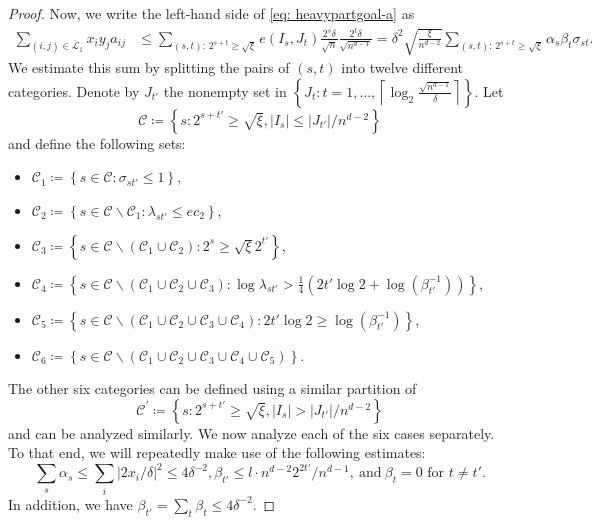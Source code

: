 \documentclass{article}
\theoremstyle{plain}
\theoremstyle{definition}
\theoremstyle{remark}
\begin{document}
\begin{appendix}
\begin{center}
\begin{proof}
			Now, we write the left-hand side of \eqref{eq: heavypartgoal-a} as
			\begin{align}
				\sum_{(i, j) \in \overline{\mathcal{L}}_1} x_i y_j a_{i j} & \leq \sum_{(s, t):\, 2^{s+t} \geq \sqrt{\xi}} e\left(I_s, J_t\right) \frac{2^s \delta}{\sqrt{n}} \frac{2^t \delta}{\sqrt{n^{d-1}}} = \delta^2 \sqrt{\frac{\xi}{n^{d-2}}} \sum_{(s, t): \,2^{s+t} \geq \sqrt{\xi}} \alpha_s \beta_t \sigma_{s t}. \label{eq: heavysum}
			\end{align}
			We estimate this sum by splitting the pairs of $(s, t)$ into twelve different categories. Denote by $J_{t'}$ the nonempty set in $\left\{J_t:t=1,\dots,\left\lceil\log _2 \frac{\sqrt{n^{d-1}}}{\delta}\right\rceil\right\}$. Let
			\[
			\mathcal{C}\coloneqq \left\{s: 2^{s+t'} \geq \sqrt{\xi},\left|I_s\right| \leq\left|J_{t'}\right|/n^{d-2}\right\}
			\] and define the following sets:
			\begin{itemize}
				\item $\mathcal{C}_1 \coloneqq \left\{s \in \mathcal{C}: \sigma_{s t'} \leq 1 \right\}$,
				\item $\mathcal{C}_2\coloneqq \left\{ s \in \mathcal{C} \backslash \mathcal{C}_1: \lambda_{s t'} \leq e c_2\right\}$,
				\item $\mathcal{C}_3\coloneqq \left\{s\in \mathcal{C} \backslash\left(\mathcal{C}_1 \cup \mathcal{C}_2\right): 2^s \geq \sqrt{\xi} 2^{t'}\right\}$,
				\item $\mathcal{C}_4\coloneqq\left\{s \in \mathcal{C} \backslash\left(\mathcal{C}_1 \cup \mathcal{C}_2 \cup \mathcal{C}_3\right): \log \lambda_{st'} > \frac{1}{4} \left(2t' \log 2 + \log ( \beta_{t'}^{-1} ) \right)\right\}$,
				\item $\mathcal{C}_5\coloneqq \left\{s \in \mathcal{C} \backslash\left(\mathcal{C}_1 \cup \mathcal{C}_2 \cup \mathcal{C}_3 \cup \mathcal{C}_4\right): 2 t' \log 2 \geq \log ( \beta_{t'}^{-1} ) \right\}$,
				\item $\mathcal{C}_6\coloneqq \left\{s \in \mathcal{C} \backslash\left(\mathcal{C}_1 \cup \mathcal{C}_2 \cup \mathcal{C}_3 \cup \mathcal{C}_4 \cup \mathcal{C}_5\right)\right\}$.
			\end{itemize}
			The other six categories can be defined using a similar partition of
			$$
			\mathcal{C}^{\prime}\coloneqq \left\{s: 2^{s+t'} \geq \sqrt{\xi},\left|I_s\right|>\left|J_{t'}\right|/n^{d-2}\right\}
			$$
			and can be analyzed similarly. We now analyze each of the six cases separately. To that end, we will repeatedly make use of the following estimates:
			\[
			\sum_s \alpha_s \leq \sum_i\left|2 x_i / \delta\right|^2 \leq 4 \delta^{-2}, \beta_{t'} \leq l\cdot n^{d-2} 2^{2 t'} / n^{d-1},~\text{and}~\beta_t = 0 \text{ for } t \neq t'.
			\]
			In addition, we have $\beta_{t'} = \sum_t \beta_t \leq 4 \delta^{-2}$.
			

\end{proof}
\end{center}
\end{appendix}
\end{document}
